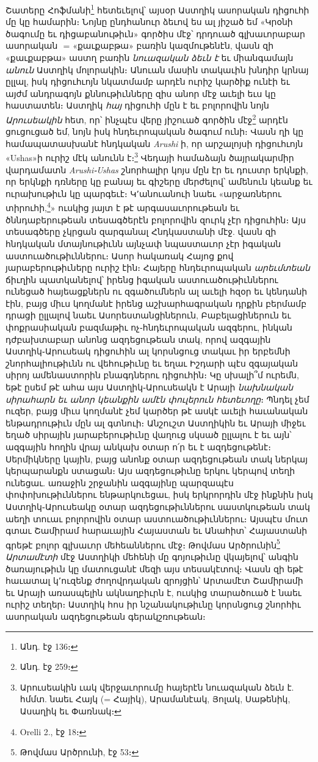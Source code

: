 \documentclass{article}
\newcommand*\svgAAAB{}
\begin{document}
{Շատերը Հոֆմանի\footnote{Անդ. էջ 136։} հետեւելով՝ այսօր Աստղիկ ասորական դիցուհի մը կը համարին։ Նոյնը ընդհանուր ձեւով ես ալ յիշած եմ «Կրօնի ծագումը եւ դիցաբանութիւն» գործիս մէջ՝ դրդուած գլխաւորաբար ասորական $\svgAAAB$ = «քաւքաբթա» բառին կազմութենէն, վասն զի «քաւքաբթա» աստղ բառին \emph{նուազական ձեւն է} եւ միանգամայն \emph{անուն} Աստղիկ մոլորակին։ Անուան մասին տակաւին խնդիր կրնայ ըլլալ, իսկ դիցուհւոյն նկատմամբ արդէն ուրիշ կարծիք ունէի եւ այժմ անդրագոյն քննութիւնները զիս անոր մէջ աւելի եւս կը հաստատեն։ Աստղիկ \emph{հայ} դիցուհի մըն է եւ բոլորովին նոյն \emph{Արուսեակին} հետ, որ՝ ինչպէս վերը յիշուած գործին մէջ\footnote{Անդ. էջ 259։} արդէն ցուցուցած եմ, նոյն իսկ հնդեւրոպական ծագում ունի։ Վասն ղի կը համապատասխանէ հնդկական \emph{Arushi} ի, որ արշալոյսի դիցուհւոյն «Ushas»ի ուրիշ մէկ անունն է։\footnote{Արուսեակին ւակ վերջաւորումը հայերէն նուազական ձեւն է. հմմտ. նաեւ Հայկ (= Հայիկ), Արամանէակ, Յոլակ, Սաթենիկ, Ասաղիկ եւ Փառնակ։} Վեդայի համաձայն ծայրակարմիր վարդամատն \emph{Arushi֊Ushas} շնորհալիր կոյս մըն էր եւ դուստր երկնքի, որ երկնքի դռները կը բանայ եւ գիշերը մերժելով՝ ամենուն կեանք եւ ուրախութիւն կը պարգեւէ։ Կ՚անուանուի նաեւ «արջառներու տիրուհի,\footnote{Orelli 2., էջ 18։}» ուսկից յայտ է թէ արգասաւորութեան եւ ծննդաբերութեան տեսագծերէն բոլորովին զուրկ չէր դիցուհին։ Այս տեսագծերը չկրցան զարգանալ Հնդկաստանի մէջ. վասն զի հնդկական մտայնութիւնն այնչափ նպաստաւոր չէր իգական աստուածութիւններու։ Ասոր հակառակ Հայոց քով յարաբերութիւները ուրիշ էին։ Հայերը հնդեւրոպական \emph{արեւմտեան} ճիւղին պատկանելով՝ իրենց իգական աստուածութիւններու ունեցած հայեացքներն ու զգածումներն ալ աւելի հզօր եւ կենդանի էին, բայց միւս կողմանէ իրենց աշխարհագրական դրքին բերմամբ դրացի ըլլալով նաեւ Ասորեստանցիներուն, Բաբելացիներուն եւ փոքրասիական բազմաթիւ ոչ֊հնդեւրոպական ազգերու, ինկան դժբախտաբար անոնց ազդեցութեան տակ, որով ազգային Աստղիկ֊Արուսեակ դիցուհին ալ կորսնցուց տակաւ իր երբեմնի շնորհալիութիւնն ու վեհութիւնը եւ եղաւ Իշդարի պէս զգայական սիրոյ ամենաստորին բնագդներու դիցուհին։ Կը սխալի՞մ ուրեմն, եթէ ըսեմ թէ ահա այս Աստղիկ֊Արուսեակն է Արայի \emph{նախնական սիրահարն եւ անոր կեանքին ամէն փուլերուն հետեւողը}։ Պնդել չեմ ուզեր, բայց միւս կողմանէ չեմ կարծեր թէ ասկէ աւելի հաւանական ենթադրութիւն մըն ալ գտնուի։ Անշուշտ Աստղիկին եւ Արայի միջեւ եղած սիրային յարաբերութիւնը վաղուց սկսած ըլլալու է եւ այն՝ ազգային հողին վրայ անկախ օտար ո՛ր եւ է ազդեցութենէ։ Սերմիկները կային, բայց անոնք օտար ազդեցութեան տակ ներկայ կերպարանքն ստացան։ Այս ազդեցութիւնը երկու կերպով տեղի ունեցաւ. առաջին շրջանին ազգայինը պարզապէս փոփոխութիւններու ենթարկուեցաւ, իսկ երկրորդին մէջ ինքնին իսկ Աստղիկ֊Արուսեակը օտար ազդեցութիւններու սաստկութեան տակ աեղի տուաւ բոլորովին օտար աստուածութիւններու։ Այսպէս մուտ գտաւ Շամիրամ հարաւային Հայաստան եւ Անահիտ՝ Հայաստանի գրեթէ բոլոր գլխաւոր մեհեաններու մէջ։ Թովմաս Արծրունին\footnote{Թովմաս Արծրունի, էջ 53։} \emph{Արտամէտի} մէջ Աստղիկի մեհենի մը գոյութիւնը վկայելով՝ անգին ծառայութիւն կը մատուցանէ մեզի այս տեսակէտով։ Վասն զի եթէ հաւատալ կ՚ուզենք ժողովրդական զրոյցին՝ Արտամէտ Շամիրամի եւ Արայի առասպելին ակնաղբիւրն է, ուսկից տարածուած է նաեւ ուրիշ տեղեր։ Աստղիկ հոս իր նշանակութիւնը կորսնցուց շնորհիւ ասորական ազդեցութեան գերակշռութեան։

}
\end{document}

